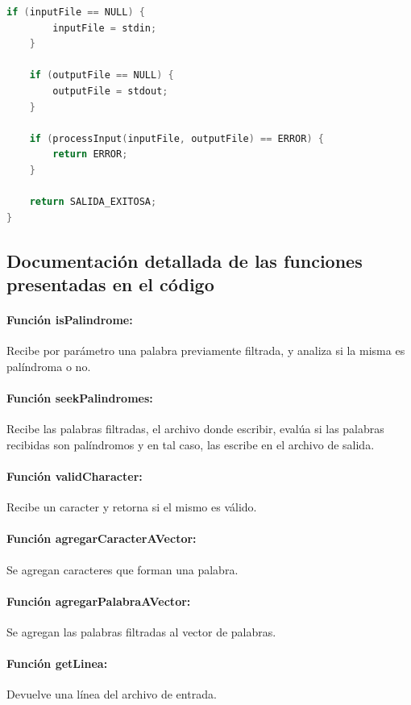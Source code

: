 \documentclass[a4paper]{article}
\begin{document}
\begin{lstlisting}[language=C]
    if (inputFile == NULL) {
        inputFile = stdin;
    }

    if (outputFile == NULL) {
        outputFile = stdout;
    }

    if (processInput(inputFile, outputFile) == ERROR) {
        return ERROR;
    }

    return SALIDA_EXITOSA;
}

\end{lstlisting}

\subsection{Documentación detallada de las funciones presentadas en el código}

\paragraph{Función isPalindrome:}
Recibe por parámetro una palabra previamente filtrada, y analiza si la misma es palíndroma o no.

\paragraph{Función seekPalindromes:}
Recibe las palabras filtradas, el archivo donde escribir, evalúa si las palabras recibidas son palíndromos y en tal caso, las escribe en el archivo de salida.

\paragraph{Función validCharacter:}
Recibe un caracter y retorna si el mismo es válido.

\paragraph{Función agregarCaracterAVector:}
Se agregan caracteres que forman una palabra.

\paragraph{Función agregarPalabraAVector:}
Se agregan las palabras filtradas al vector de palabras.

\paragraph{Función getLinea:}
Devuelve una línea del archivo de entrada.
\end{document}
